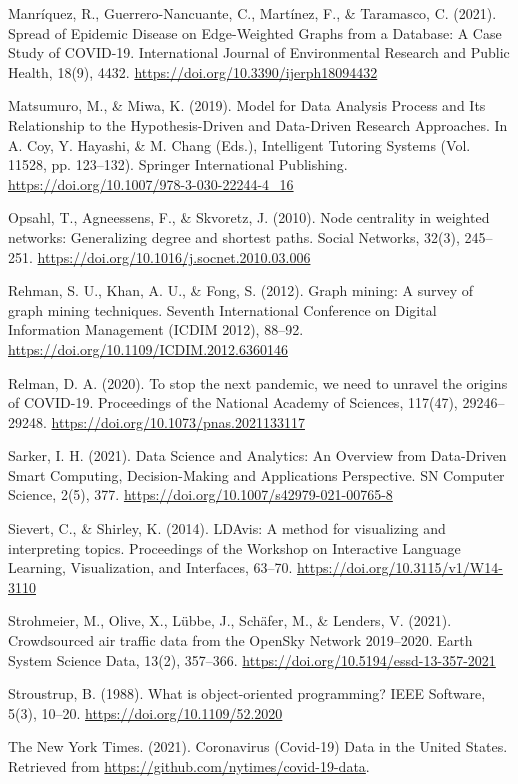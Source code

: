 \documentclass[10pt, a4paper, twocolumn]{article} %
\begin{document}
Manríquez, R., Guerrero-Nancuante, C., Martínez, F., \& Taramasco, C. (2021). Spread of Epidemic Disease on Edge-Weighted Graphs from a Database: A Case Study of COVID-19. International Journal of Environmental Research and Public Health, 18(9), 4432. \url{https://doi.org/10.3390/ijerph18094432}

Matsumuro, M., \& Miwa, K. (2019). Model for Data Analysis Process and Its Relationship to the Hypothesis-Driven and Data-Driven Research Approaches. In A. Coy, Y. Hayashi, \& M. Chang (Eds.), Intelligent Tutoring Systems (Vol. 11528, pp. 123–132). Springer International Publishing. \url{https://doi.org/10.1007/978-3-030-22244-4_16}

Opsahl, T., Agneessens, F., \& Skvoretz, J. (2010). Node centrality in weighted networks: Generalizing degree and shortest paths. Social Networks, 32(3), 245–251. \url{https://doi.org/10.1016/j.socnet.2010.03.006}

Rehman, S. U., Khan, A. U., \& Fong, S. (2012). Graph mining: A survey of graph mining techniques. Seventh International Conference on Digital Information Management (ICDIM 2012), 88–92. \url{https://doi.org/10.1109/ICDIM.2012.6360146}

Relman, D. A. (2020). To stop the next pandemic, we need to unravel the origins of COVID-19. Proceedings of the National Academy of Sciences, 117(47), 29246–29248. \url{https://doi.org/10.1073/pnas.2021133117}

Sarker, I. H. (2021). Data Science and Analytics: An Overview from Data-Driven Smart Computing, Decision-Making and Applications Perspective. SN Computer Science, 2(5), 377. \url{https://doi.org/10.1007/s42979-021-00765-8}

Sievert, C., \& Shirley, K. (2014). LDAvis: A method for visualizing and interpreting topics. Proceedings of the Workshop on Interactive Language Learning, Visualization, and Interfaces, 63–70. \url{https://doi.org/10.3115/v1/W14-3110}

Strohmeier, M., Olive, X., Lübbe, J., Schäfer, M., \& Lenders, V. (2021). Crowdsourced air traffic data from the OpenSky Network 2019–2020. Earth System Science Data, 13(2), 357–366. \url{https://doi.org/10.5194/essd-13-357-2021}

Stroustrup, B. (1988). What is object-oriented programming? IEEE Software, 5(3), 10–20. \url{https://doi.org/10.1109/52.2020}

The New York Times. (2021). Coronavirus (Covid-19) Data in the United States. Retrieved from \url{https://github.com/nytimes/covid-19-data}.
\end{document}
